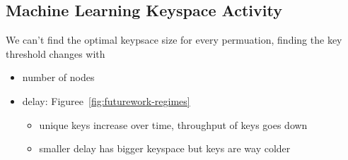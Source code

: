 \subsection{Machine Learning Keyspace Activity}

We can't find the optimal keypsace size for every permuation, finding the key threshold changes with
\begin{itemize}
  \item number of nodes
  \item delay: Figuree~\ref{fig:futurework-regimes}
  \begin{itemize}
    \item unique keys increase over time, throughput of keys goes down
    \item smaller delay has bigger keyspace but keys are way colder 
  \end{itemize}
\end{itemize}


